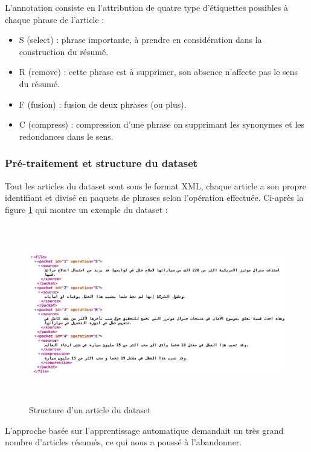         L'annotation consiste en l'attribution de quatre type d'étiquettes possibles à chaque phrase de l'article :
            \begin{itemize}
                \item S (select) : phrase importante, à prendre en considération dans la construction du résumé.
                \item R (remove) : cette phrase est à supprimer, son absence n'affecte pas le sens du résumé.
                \item F (fusion) : fusion de deux phrases (ou plus).
                \item C (compress) : compression d'une phrase on supprimant les synonymes et les redondances dans le sens.\\
            \end{itemize}

        \subsubsection{Pré-traitement et structure du dataset}
        Tout les articles du dataset sont sous le format XML, chaque article a son propre identifiant et divisé en paquets de phrases selon l'opération effectuée. Ci-après la figure \ref{xml-structure} qui montre un exemple du dataset : 
        \begin{figure}[H]
            \centering
            \includegraphics[height=220pt,width=430pt]{img/chapter4/xml.png}
            \caption{Structure d'un article du dataset}
            \label{xml-structure}
        \end{figure}
        L'approche basée sur l'apprentissage automatique demandait un très grand nombre d'articles résumés, ce qui nous a poussé à l'abandonner.

